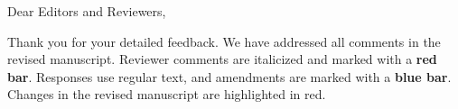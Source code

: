 \documentclass[12pt,a4paper]{report}
\begin{document}

    \par\medskip
    \noindent Dear Editors and Reviewers,

    Thank you for your detailed feedback. We have addressed all comments in the revised manuscript.
    Reviewer comments are italicized and marked with a \textbf{{\color{ReviewerRed}red bar}}.
    Responses use regular text, and amendments are marked with a \textbf{{\color{AmendmentBlue}blue bar}}.
    Changes in the revised manuscript are highlighted in {\color{ReviewerRed}red}.

	
    
    
\end{document}
